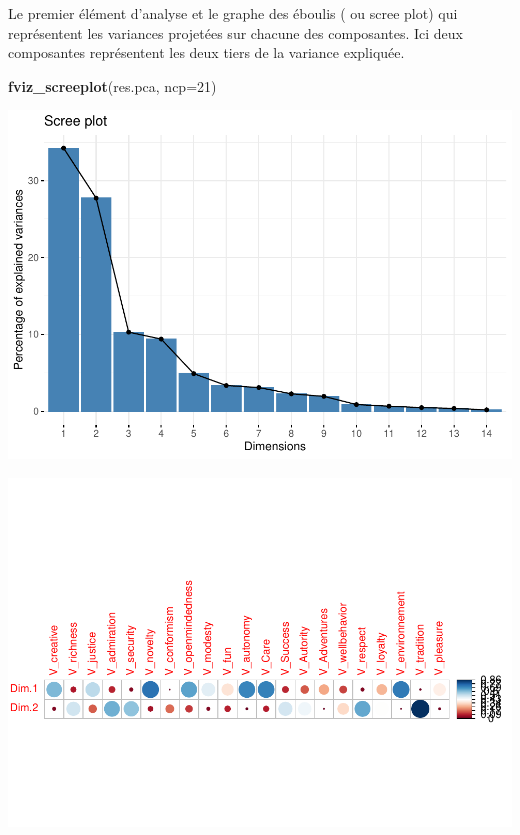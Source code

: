 \documentclass[
]{book}
\newenvironment{Shaded}{\begin{snugshade}}{\end{snugshade}}
\newcommand{\DataTypeTok}[1]{\textcolor[rgb]{0.13,0.29,0.53}{#1}}
\newcommand{\DecValTok}[1]{\textcolor[rgb]{0.00,0.00,0.81}{#1}}
\newcommand{\FloatTok}[1]{\textcolor[rgb]{0.00,0.00,0.81}{#1}}
\newcommand{\KeywordTok}[1]{\textcolor[rgb]{0.13,0.29,0.53}{\textbf{#1}}}
\newcommand{\NormalTok}[1]{#1}
\newcommand{\OperatorTok}[1]{\textcolor[rgb]{0.81,0.36,0.00}{\textbf{#1}}}
\newcommand{\OtherTok}[1]{\textcolor[rgb]{0.56,0.35,0.01}{#1}}
\newcommand{\StringTok}[1]{\textcolor[rgb]{0.31,0.60,0.02}{#1}}
\begin{document}
Le premier élément d'analyse et le graphe des éboulis ( ou scree plot) qui représentent les variances projetées sur chacune des composantes. Ici deux composantes représentent les deux tiers de la variance expliquée.

\begin{Shaded}
\begin{Highlighting}[]
\KeywordTok{fviz_screeplot}\NormalTok{(res.pca, }\DataTypeTok{ncp=}\DecValTok{21}\NormalTok{)}
\end{Highlighting}
\end{Shaded}

\includegraphics{bookdown-demo_files/figure-latex/0608-1.pdf}

\begin{Shaded}
\end{Shaded}

\includegraphics{bookdown-demo_files/figure-latex/0609-1.pdf}
\end{document}
